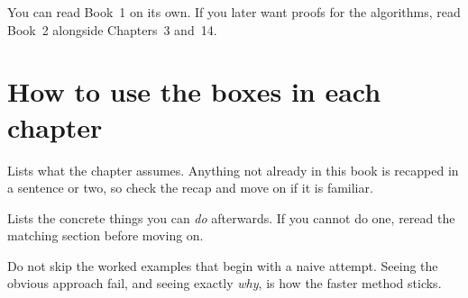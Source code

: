 You can read Book~1 on its own. If you later want proofs for the algorithms, read
Book~2 alongside Chapters~3 and~14.

\section*{How to use the boxes in each chapter}

\begin{rulebox}
Lists what the chapter assumes. Anything not already in this book is recapped in
a sentence or two, so check the recap and move on if it is familiar.
\end{rulebox}
\begin{wins}
Lists the concrete things you can \emph{do} afterwards. If you cannot do one,
reread the matching section before moving on.
\end{wins}

Do not skip the worked examples that begin with a naive attempt. Seeing the obvious
approach fail, and seeing exactly \emph{why}, is how the faster method sticks.

